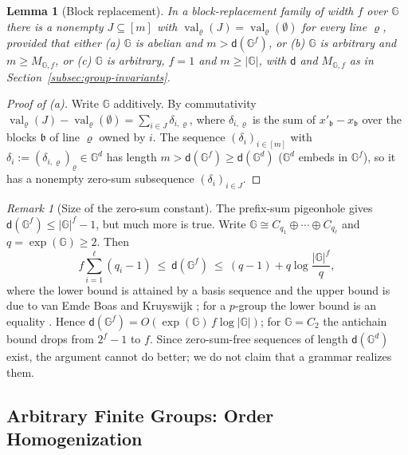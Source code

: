 \documentclass[11pt]{article}
\numberwithin{equation}{section}
\theoremstyle{plain}
\newtheorem{lemma}[theorem]{Lemma}
\theoremstyle{definition}
\theoremstyle{remark}
\newtheorem{remark}[theorem]{Remark}
\theoremstyle{plain}
\begin{document}
\begin{lemma}[Block replacement]
\label{lem:block-replacement}
In a block-replacement family of width $f$ over ${\mathbb G}$ there is a nonempty
$J\subseteq[m]$ with $\operatorname{val}_\varrho(J)=\operatorname{val}_\varrho(\emptyset)$ for every
line $\varrho$, provided that either
\textup{(a)} ${\mathbb G}$ is abelian and $m>\mathsf d({\mathbb G}^f)$, or
\textup{(b)} ${\mathbb G}$ is arbitrary and $m\ge M_{{\mathbb G},f}$, or
\textup{(c)} ${\mathbb G}$ is arbitrary, $f=1$ and $m\ge|{\mathbb G}|$, with $\mathsf d$ and
$M_{{\mathbb G},f}$ as in Section~\ref{subsec:group-invariants}.
\end{lemma}

\begin{proof}[Proof of \textup{(a)}]
Write ${\mathbb G}$ additively.  By commutativity
$\operatorname{val}_\varrho(J)-\operatorname{val}_\varrho(\emptyset)=\sum_{i\in J}\delta_{i,\varrho}$, where
$\delta_{i,\varrho}$ is the sum of $x'_{\mathfrak b}-x_{\mathfrak b}$ over the blocks $\mathfrak b$ of line $\varrho$
owned by $i$.  The sequence $(\delta_i)_{i\in[m]}$ with $\delta_i:=(\delta_{i,\varrho})_\varrho\in {\mathbb G}^d$
has length $m>\mathsf d({\mathbb G}^f)\ge\mathsf d({\mathbb G}^d)$ (${\mathbb G}^d$ embeds in ${\mathbb G}^f$), so it has a
nonempty zero-sum subsequence $(\delta_i)_{i\in J}$.
\end{proof}

\begin{remark}[Size of the zero-sum constant]
\label{rem:davenport-size}
The prefix-sum pigeonhole gives $\mathsf d({\mathbb G}^f)\le|{\mathbb G}|^f-1$, but much more is true.
Write ${\mathbb G}\cong C_{q_1}\oplus\cdots\oplus C_{q_\ell}$ and $q=\exp({\mathbb G})\ge2$.  Then
\[
 f\sum_{i=1}^{\ell}(q_i-1)\ \le\ \mathsf d({\mathbb G}^f)\ \le\ (q-1)+q\log\frac{|{\mathbb G}|^f}{q},
\]
where the lower bound is attained by a basis sequence and the upper bound is due to
van Emde Boas and Kruyswijk \cite[Proposition~5.1.8 and
Theorem~5.5.5]{GeroldingerHalterKoch2006}; for a $p$-group the lower bound is an
equality \cite[Theorem~5.5.9]{GeroldingerHalterKoch2006}.  Hence
$\mathsf d({\mathbb G}^f)=O(\exp({\mathbb G})\,f\log|{\mathbb G}|)$; for ${\mathbb G}=C_2$ the antichain bound drops from
$2^f-1$ to $f$.  Since zero-sum-free sequences of length $\mathsf d({\mathbb G}^d)$ exist, the
argument cannot do better; we do not claim that a grammar realizes them.
\end{remark}

\subsection{Arbitrary Finite Groups: Order Homogenization}
\label{app:window-group}
\end{document}
